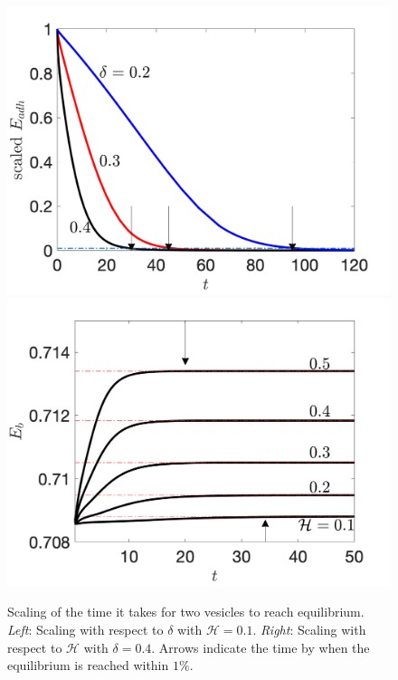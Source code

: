 \documentclass[prf,superscriptaddress,showkeys]{revtex4-1}
\begin{document}
\begin{figure}
\includegraphics[keepaspectratio=true,scale=0.4]{figs/Dec13a_time_scaling01.png}
\includegraphics[keepaspectratio=true,scale=0.4]{figs/Dec13a_time_scaling02.png}
\caption{\label{fig:qflow00} Scaling of the time it takes for two
  vesicles to reach equilibrium. {\em Left}: Scaling with respect to
  $\delta$ with $\mathcal{H}=0.1$.  {\em Right}: Scaling with respect to
  $\mathcal{H}$ with
  $\delta = 0.4$. Arrows indicate the time by when the equilibrium is
  reached within $1\%$.}
\end{figure}
\end{document}
